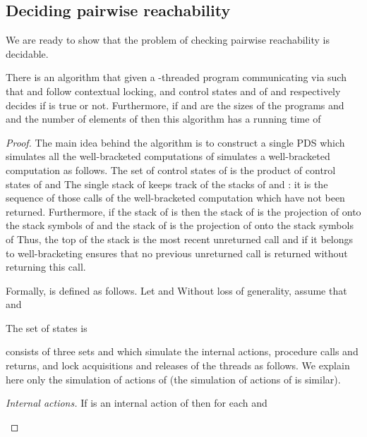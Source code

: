 \documentclass{LMCS}
\begin{document}
\subsection{Deciding   pairwise reachability}
We are ready to show that the problem of checking pairwise reachability is decidable.

\begin{theorem} There is an algorithm that
given a -threaded program  communicating via  such that  and  follow contextual locking, and control states  and 
of  and  respectively decides if  is true or not. Furthermore, if  and  are the sizes of
the  programs  and  and  the number of elements of  then this algorithm has a running time of 

\end{theorem}
\begin{proof}
The main idea behind the algorithm is to construct a single PDS  which simulates all the well-bracketed
computations of     simulates a well-bracketed computation as follows.
The set of control states of  is the product of control states of  and 
The single stack of  keeps track of the stacks of  and : it
is the sequence of those calls of the well-bracketed computation which have not been returned.
 Furthermore, if the stack of 
is  then  the stack of  is the projection of  onto the stack symbols of  and the
stack of  is the projection  of  onto the stack symbols of  Thus, the top of the stack is the most recent unreturned call and if it belongs to  well-bracketing ensures
that no previous unreturned call is returned without returning this call.


Formally,  is defined as follows. Let  and
 Without loss of generality,  assume that 
and 

\begin{iteMize}{}
\item   The set of states  is 


\item  \item 
     \item  consists of three sets  and  which simulate the
             internal actions, procedure calls and returns, and lock acquisitions and releases of the threads
              as follows. We explain here only the simulation of actions of  (the simulation of actions of  is similar).
                 \begin{iteMize}{}
                 \item {\it Internal actions.} If  is an internal action of  then for each  and 
                  

\end{iteMize}
\end{iteMize}
\end{proof}
\end{document}
